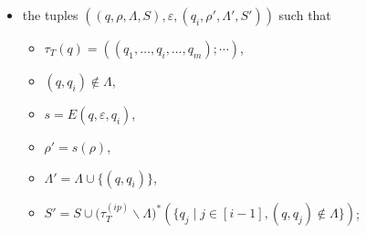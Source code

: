 \begin{itemize}
\begin{itemize}
\begin{itemize}
                                    \end{itemize}
                                \item the tuples $((q, \rho, \Lambda, S), \varepsilon, (q_i, \rho', \Lambda', S'))$ such that 
                                    \begin{itemize}
                                        \item $\tau_T(q) = ((q_1, \ldots, q_i, \ldots, q_m); \cdots)$, 
                                        \item $(q, q_i) \not \in \Lambda$,

                                        \item $s = E(q, \varepsilon, q_i)$, 
                                        \item $\rho' = s(\rho)$,
                                        \item $\Lambda' = \Lambda \cup \{(q, q_i)\}$, 
                                        \item $S' =  S \cup \big(\tau^{(ip)}_T \backslash \Lambda \big)^\ast(\{ q_j \mid j \in [i-1], (q, q_j) \not \in \Lambda \})$;
                                    \end{itemize}


\end{itemize}
\end{itemize}
